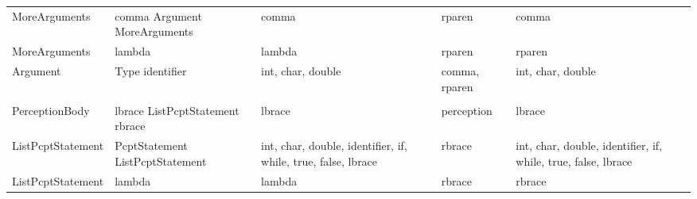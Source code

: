 \begin{table}[H]
\begin{tabularx}{\textwidth}{BBBBB}
     MoreArguments & comma Argument MoreArguments & comma & rparen & comma \\
     MoreArguments & lambda & lambda & rparen & rparen \\
     Argument & Type identifier & int, char, double & comma, rparen & int, char, double \\
           &       &       &       &  \\
     PerceptionBody & lbrace ListPcptStatement rbrace & lbrace & perception & lbrace \\
     ListPcptStatement & PcptStatement ListPcptStatement & int, char, double, identifier, if, while, true, false, lbrace & rbrace & int, char, double, identifier, if, while, true, false, lbrace \\
     ListPcptStatement & lambda & lambda & rbrace & rbrace \\


     \bottomrule
     \end{tabularx}%
   \label{tab:gramatica}%
 \end{table}%

